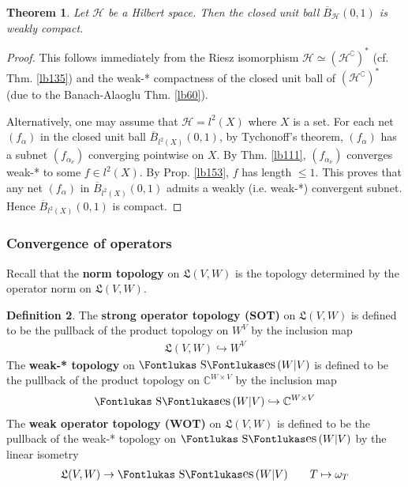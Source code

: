 \documentclass[12pt,b5paper,notitlepage]{article}
\theoremstyle{definition}
\newtheorem{df}{Definition}[subsection]
\theoremstyle{plain}
\newtheorem{thm}[df]{Theorem}
\DeclareMathOperator{\Ses}{\text{\Fontlukas S}\text{\kern -0pt {\Fontlukas\large es}}\,}
\newcommand{\fk}{\mathfrak}
\newcommand{\ovl}{\overline}
\newcommand{\Co}{\complement}
\newcommand{\Cbb}{\mathbb C}
\newcommand{\MH}{\mathcal H}
\numberwithin{equation}{section}
\begin{document}
\begin{thm}\label{lb494}
Let $\MH$ be a Hilbert space. Then the closed unit ball $\ovl B_\MH(0,1)$ is weakly compact.
\end{thm}

\begin{proof}
This follows immediately from the Riesz isomorphism $\MH\simeq(\MH^\Co)^*$ (cf. Thm. \ref{lb135}) and the weak-* compactness of the closed unit ball of $(\MH^\Co)^*$ (due to the Banach-Alaoglu Thm. \ref{lb60}).

Alternatively, one may assume that $\MH=l^2(X)$ where $X$ is a set. For each net $(f_\alpha)$ in the closed unit ball $\ovl B_{l^2(X)}(0,1)$, by Tychonoff's theorem, $(f_\alpha)$ has a subnet $(f_{\alpha_\nu})$ converging pointwise on $X$. By Thm. \ref{lb111}, $(f_{\alpha_\nu})$ converges weak-* to some $f\in l^2(X)$. By Prop. \ref{lb153}, $f$ has length $\leq 1$. This proves that any net $(f_\alpha)$ in $\ovl B_{l^2(X)}(0,1)$ admits a weakly (i.e. weak-*) convergent subnet. Hence $\ovl B_{l^2(X)}(0,1)$ is compact.
\end{proof}



\subsubsection{Convergence of operators}


Recall that the \textbf{norm topology} on $\fk L(V,W)$ is the topology determined by the operator norm on $\fk L(V,W)$.

\begin{df}
The \textbf{strong operator topology (SOT)}   on $\fk L(V,W)$ is defined to be the pullback of the product topology on $W^V$ by the inclusion map
\begin{align*}
\fk L(V,W)\hookrightarrow W^V
\end{align*}
The \textbf{weak-* topology} \index{00@Weak-* topology on $\Ses(W\vert V)$} on $\Ses(W|V)$ is defined to be the pullback of the product topology on $\Cbb^{W\times V}$ by the inclusion map
\begin{align*}
\Ses(W|V)\hookrightarrow \Cbb^{W\times V}
\end{align*}
The \textbf{weak operator topology (WOT)}   on $\fk L(V,W)$ is defined to be the pullback of the weak-* topology on $\Ses(W|V)$ by the linear isometry
\begin{align*}
\fk L(V,W)\rightarrow\Ses(W|V)\qquad T\mapsto \omega_T
\end{align*}
\end{df}
\end{document}
